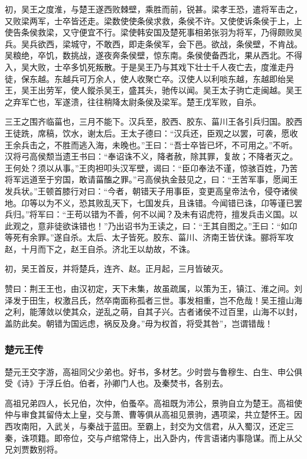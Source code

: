 \documentclass[]{article}
\begin{document}
初，吴王之度淮，与楚王遂西败棘壁，乘胜而前，锐甚。梁孝王恐，遣将军击之，又败梁两军，士卒皆还走。梁数使使条侯求救，条侯不许。又使使诉条侯于上，上使告条侯救梁，又守便宜不行。梁使韩安国及楚死事相弟张羽为将军，乃得颇败吴兵。吴兵欲西，梁城守，不敢西，即走条侯军，会下邑。欲战，条侯壁，不肯战。吴粮绝，卒饥，数挑战，遂夜奔条侯壁，惊东南。条侯使备西北，果从西北。不得入，吴大败，士卒多饥死叛散。于是吴王乃与其戏下壮士千人夜亡去，度淮走丹徒，保东越。东越兵可万余人，使人收聚亡卒。汉使人以利啖东越，东越即绐吴王，吴王出劳军，使人鏦杀吴王，盛其头，驰传以闻。吴王太子驹亡走闽越。吴王之弃军亡也，军遂溃，往往稍降太尉条侯及梁军。楚王戊军败，自杀。

三王之围齐临菑也，三月不能下。汉兵至，胶西、胶东、菑川王各引兵归国。胶西王徒跣，席稿，饮水，谢太后。王太子德曰：``汉兵还，臣观之以罢，可袭，愿收王余兵击之，不胜而逃入海，未晚也。''王曰：``吾士卒皆已坏，不可用之。''不听。汉将弓高侯颓当遗王书曰：``奉诏诛不义，降者赦，除其罪，复故；不降者灭之。王何处？须以从事。''王肉袒叩头汉军壁，谒曰：``臣卬奉法不谨，惊骇百姓，乃苦将军远道至于穷国，敢请菑醢之罪。''弓高侯执金鼓见之，曰：``王苦军事，愿闻王发兵状。''王顿首膝行对曰：``今者，朝错天子用事臣，变更高皇帝法令，侵夺诸侯地。卬等以为不义，恐其败乱天下，七国发兵，且诛错。今闻错已诛，卬等谨已罢兵归。''将军曰：``王苟以错为不善，何不以闻？及未有诏虎符，擅发兵击义国。以此观之，意非徒欲诛错也！''乃出诏书为王读之，曰：``王其自图之。''王曰：``如卬等死有余罪。''遂自杀。太后、太子皆死。胶东、菑川、济南王皆伏诛。郦将军攻赵，十月而下之，赵王自杀。济北王以劫故，不诛。

初，吴王首反，并将楚兵，连齐、赵。正月起，三月皆破灭。

赞曰：荆王王也，由汉初定，天下未集，故虽疏属，以策为王，镇江、淮之间。刘泽发于田生，权激吕氏，然卒南面称孤者三世。事发相重，岂不危哉！吴王擅山海之利，能薄敛以使其众，逆乱之萌，自其子兴。古者诸侯不过百里，山海不以封，盖防此矣。朝错为国远虑，祸反及身。''毋为权首，将受其咎''，岂谓错哉！

\hypertarget{header-n3606}{%
\subsubsection{楚元王传}\label{header-n3606}}

楚元王交字游，高祖同父少弟也。好书，多材艺。少时尝与鲁穆生、白生、申公俱受《诗》于浮丘伯。伯者，孙卿门人也。及秦焚书，各别去。

高祖兄弟四人，长兄伯，次仲，伯蚤卒。高祖既为沛公，景驹自立为楚王。高祖使仲与审食其留侍太上皇，交与萧、曹等俱从高祖见景驹，遇项梁，共立楚怀王。因西攻南阳，入武关，与秦战于蓝田。至霸上，封交为文信君，从入蜀汉，还定三秦，诛项籍。即帝位，交与卢绾常侍上，出入卧内，传言语诸内事隐谋。而上从父兄刘贾数别将。
\end{document}
